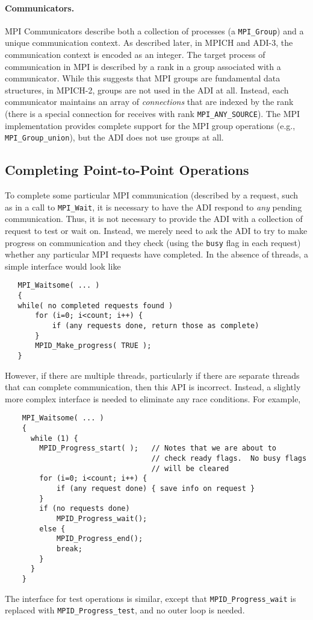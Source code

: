 \documentclass{article}
\def\code#1{\texttt{#1}}
\begin{document}
\paragraph{Communicators.}

MPI Communicators describe both a collection of processes (a
\code{MPI_Group}) and a unique communication context.  As described
later, in MPICH and ADI-3, the communication context is encoded as an
integer.  The target process of communication in MPI is described by a
rank in a group associated with a communicator.  While this suggests
that MPI groups are fundamental data structures, in MPICH-2, groups
are not used in the ADI at all.  Instead, each communicator maintains
an array of \emph{connections} that are indexed by the rank (there is
a special connection for receives with rank \code{MPI_ANY_SOURCE}).
The MPI implementation provides complete support for the MPI group
operations (e.g., \code{MPI_Group_union}), but the ADI does not use
groups at all.  

\subsection{Completing Point-to-Point Operations}

To complete some particular MPI communication (described by a request,
such as in a call to \code{MPI_Wait}, it is necessary to have the ADI
respond to \emph{any} pending communication.  Thus, it is not
necessary to provide the ADI with a collection of request to test or
wait on.  Instead, we merely need to ask the ADI to try to make
progress on communication and they check (using the \code{busy} flag
in each request) whether any particular MPI requests have completed.
In the absence of threads, a simple interface would look like
\begin{verbatim}
   MPI_Waitsome( ... )
   {
   while( no completed requests found ) 
       for (i=0; i<count; i++) {
           if (any requests done, return those as complete)
       }
       MPID_Make_progress( TRUE );
   }
\end{verbatim}
However, if there are multiple threads, particularly if there are
separate threads that can complete communication, then this API is
incorrect.  Instead, a slightly more complex interface is needed to
eliminate any race conditions.  For example,
\begin{verbatim}
    MPI_Waitsome( ... )
    {
      while (1) {
        MPID_Progress_start( );   // Notes that we are about to
                                  // check ready flags.  No busy flags
                                  // will be cleared
        for (i=0; i<count; i++) {
            if (any request done) { save info on request }
        }
        if (no requests done) 
            MPID_Progress_wait();
        else {
            MPID_Progress_end();
            break;
        }
      }
    }
\end{verbatim}
The interface for test operations is similar, except that
\code{MPID_Progress_wait} is replaced with \code{MPID_Progress_test},
and no outer loop is needed.
\end{document}
